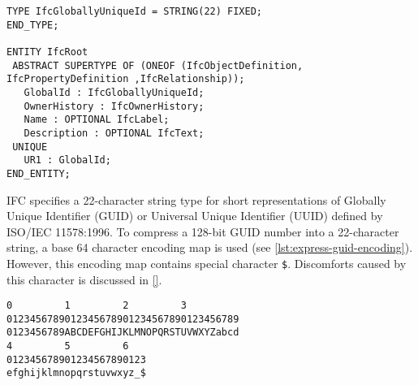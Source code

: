 \begin{lstlisting}[caption={Definition and use of type \texttt{IfcGloballyUniqueId}},label=lst:express-guid]
TYPE IfcGloballyUniqueId = STRING(22) FIXED;
END_TYPE;

ENTITY IfcRoot
 ABSTRACT SUPERTYPE OF (ONEOF (IfcObjectDefinition, IfcPropertyDefinition ,IfcRelationship));
   GlobalId : IfcGloballyUniqueId;
   OwnerHistory : IfcOwnerHistory;
   Name : OPTIONAL IfcLabel;
   Description : OPTIONAL IfcText;
 UNIQUE
   UR1 : GlobalId;
END_ENTITY;
\end{lstlisting}



IFC specifies a 22-character string type for short representations of Globally Unique Identifier (GUID) or Universal Unique Identifier (UUID) defined by ISO/IEC 11578:1996.
To compress a 128-bit GUID number into a 22-character string, a base 64 character encoding map is used (see \autoref{lst:express-guid-encoding}). 
However, this encoding map contains special character \texttt{\$}.
Discomforts caused by this character is discussed in \ref{}.




\begin{lstlisting}[caption={IFC-GUID Base-64 character encoding mapping},label=lst:express-guid-encoding]
0         1         2         3         
0123456789012345678901234567890123456789
0123456789ABCDEFGHIJKLMNOPQRSTUVWXYZabcd
4         5         6
012345678901234567890123
efghijklmnopqrstuvwxyz_$
\end{lstlisting}